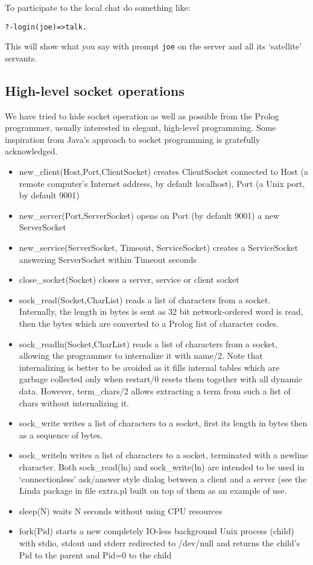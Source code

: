 \documentclass{article}
\begin{document}
To participate to the local chat do something like:
\begin{verbatim}
?-login(joe)=>talk.
\end{verbatim}

\noindent This will show what you say with prompt {\tt joe} on
the server and all its `satellite' servants.

\subsection{High-level socket operations}

We have tried to hide socket operation as well as possible from
the Prolog programmer, usually interested in elegant, high-level
programming. Some inspiration from Java's approach to socket
programming is gratefully acknowledged.

\begin{itemize}
\item
new\_client(Host,Port,ClientSocket) creates ClientSocket connected to
Host (a remote computer's Internet address, by default localhost), 
Port (a Unix port, by default 9001)
\item new\_server(Port,ServerSocket) opens on Port (by default 9001)
a new ServerSocket
\item new\_service(ServerSocket, Timeout, ServiceSocket)
creates a ServiceSocket answering ServerSocket within Timeout seconds 
\item close\_socket(Socket) closes a server, service or client socket
\item sock\_read(Socket,CharList) reads a list of characters from a
socket. Internally, the length in bytes is sent as 32 bit network-ordered
word is read, then the bytes which are converted to a Prolog list
of character codes.
\item sock\_readln(Socket,CharList) reads a list of characters from a socket, allowing the programmer to internalize it with name/2. Note that
internalizing is better to be avoided as it fills internal tables
which are garbage collected only when restart/0 resets them together
with all dynamic data. However, term\_chars/2 allows extracting
a term from such a list of chars without internalizing it.
\item sock\_write writes a list of characters
to a socket, first its length in bytes then as a sequence of bytes.
\item sock\_writeln writes a list of characters
to a socket, terminated with a newline character. Both sock\_read(ln) and
sock\_write(ln) are intended to be used in `connectionless' ask/answer
style dialog between a client and a server (see the Linda package in file extra.pl built on top of them as an example of use.
\item sleep(N) waits N seconds without using CPU resources
\item fork(Pid) starts a new completely IO-less background Unix process (child) with stdio, stdout and stderr redirected to /dev/null and returns
the child's Pid to the parent and Pid=0 to the child
\end{itemize}
\end{document}
